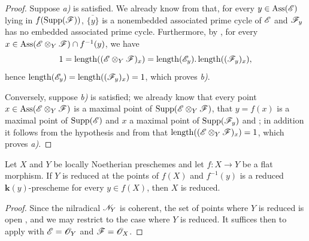 \begin{proof}
Suppose \emph{a)} is satisfied.
We already know from  that, for every $y\in\operatorname{Ass}(\mathscr{E})$ lying in $f(\operatorname{Supp}(\mathscr{F}))$, $\overline{\{y\}}$ is a nonembedded associated prime cycle of $\mathscr{E}$ and $\mathscr{F}_y$ has no embedded associated prime cycle.
Furthermore, by , for every $x\in\operatorname{Ass}(\mathscr{E}\otimes_Y\mathscr{F})\cap f^{-1}(y)$, we have
\[
1=\operatorname{length}((\mathscr{E}\otimes_Y\mathscr{F})_x)
=\operatorname{length}(\mathscr{E}_y).\operatorname{length}((\mathscr{F}_y)_x),
\]
hence $\operatorname{length}(\mathscr{E}_y)=\operatorname{length}((\mathscr{F}_y)_x)=1$, which proves \emph{b)}.

Conversely, suppose \emph{b)} is satisfied; we already know that every point $x\in\operatorname{Ass}(\mathscr{E}\otimes_Y\mathscr{F})$ is a maximal point of $\operatorname{Supp}(\mathscr{E}\otimes_Y\mathscr{F})$, that $y=f(x)$ is a maximal point of $\operatorname{Supp}(\mathscr{E})$ and $x$ a maximal point of $\operatorname{Supp}(\mathscr{F}_y)$  and ; in addition it follows from the hypothesis and from  that $\operatorname{length}((\mathscr{E}\otimes_Y\mathscr{F})_x)=1$, which proves \emph{a)}.
\end{proof}

\begin{corollary}[3.3.5]
\label{IV.3.3.5}
Let $X$ and $Y$ be locally Noetherian preschemes and let $f:X\to Y$ be a flat morphism.
If $Y$ is reduced at the points of $f(X)$ and $f^{-1}(y)$ is a reduced $\boldsymbol{k}(y)$-prescheme for every $y\in f(X)$, then $X$ is reduced.
\end{corollary}

\begin{proof}
Since the nilradical $\mathscr{N}_Y$ is coherent, the set of points where $Y$ is reduced is open , and we may restrict to the case where $Y$ is reduced.
It suffices then to apply  with $\mathscr{E}=\mathscr{O}_Y$ and $\mathscr{F}=\mathscr{O}_X$.
\end{proof}

